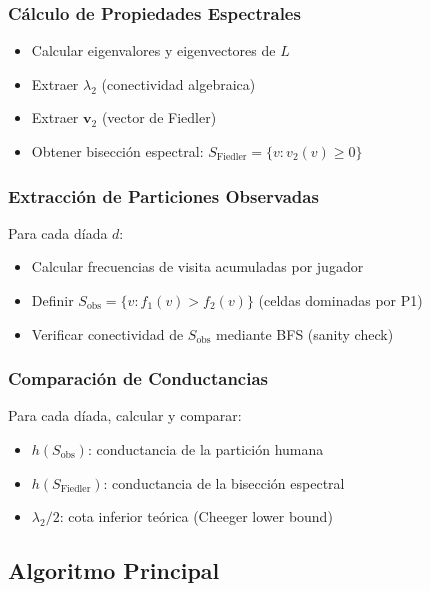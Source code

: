 \documentclass[conference]{IEEEtran}
\begin{document}
\subsubsection{Cálculo de Propiedades Espectrales}

\begin{itemize}
    \item Calcular eigenvalores y eigenvectores de $L$
    \item Extraer $\lambda_2$ (conectividad algebraica)
    \item Extraer $\mathbf{v}_2$ (vector de Fiedler)
    \item Obtener bisección espectral: $S_{\text{Fiedler}} = \{v : v_2(v) \geq 0\}$
\end{itemize}

\subsubsection{Extracción de Particiones Observadas}

Para cada díada $d$:
\begin{itemize}
    \item Calcular frecuencias de visita acumuladas por jugador
    \item Definir $S_{\text{obs}} = \{v : f_1(v) > f_2(v)\}$ (celdas dominadas por P1)
    \item Verificar conectividad de $S_{\text{obs}}$ mediante BFS (sanity check)
\end{itemize}

\subsubsection{Comparación de Conductancias}

Para cada díada, calcular y comparar:
\begin{itemize}
    \item $h(S_{\text{obs}})$: conductancia de la partición humana
    \item $h(S_{\text{Fiedler}})$: conductancia de la bisección espectral
    \item $\lambda_2/2$: cota inferior teórica (Cheeger lower bound)
\end{itemize}

\subsection{Algoritmo Principal}
\end{document}

